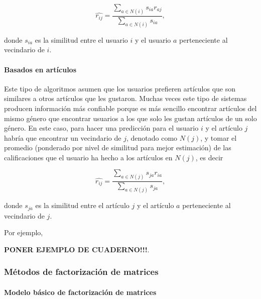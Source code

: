 \begin{equation}\label{predic_modelo_usuario_ponderado}
 \hat{r_{ij}} = \frac{\sum_{a \in N(i)} s_{ia} r_{aj}}{\sum_{a \in N(i)} s_{ia}},
\end{equation}

donde $s_{ia}$ es la similitud entre el usuario $i$ y el usuario $a$ perteneciente al vecindario de $i$.

\paragraph{Basados en artículos}

Este tipo de algoritmos asumen que los usuarios prefieren artículos que son similares a otros artículos que les gustaron. Muchas veces este tipo de sistemas producen información más confiable porque es más sencillo encontrar artículos del mismo género que encontrar usuarios a los que solo les gustan artículos de un solo género. En este caso, para hacer una predicción para el usuario $i$ y el artículo $j$ habría que encontrar un vecindario de $j$, denotado como $N(j)$, y tomar el promedio (ponderado por nivel de similitud para mejor estimación) de las calificaciones que el usuario ha hecho a los artículos en $N(j)$, es decir

\begin{equation}\label{predic_modelo_articulo_ponderado}
 \hat{r_{ij}} = \frac{\sum_{a \in N(j)} s_{ja} r_{ia}}{\sum_{a \in N(j)} s_{ja}},
\end{equation}

donde $s_{ja}$ es la similitud entre el artículo $j$ y el artículo $a$ perteneciente al vecindario de $j$.

Por ejemplo,

\textbf{PONER EJEMPLO DE CUADERNO!!!}.

\subsubsection{Métodos de factorización de matrices} \label{sec:modelo_factorizacion}

\paragraph{Modelo básico de factorización de matrices}


